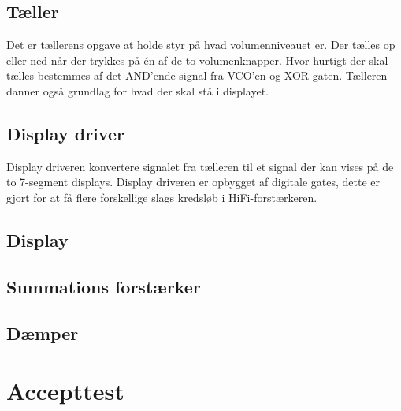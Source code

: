 \subsection{Tæller}
\label{volumenkontrol-simulering-taeller}

Det er tællerens opgave at holde styr på hvad volumenniveauet er. Der tælles op eller ned når der trykkes på én af de to volumenknapper. Hvor hurtigt der skal tælles bestemmes af det AND'ende signal fra VCO'en og XOR-gaten. Tælleren danner også grundlag for hvad der skal stå i displayet.

\subsection{Display driver}
\label{volumenkontrol-simulering-display_driver}

Display driveren konvertere signalet fra tælleren til et signal der kan vises på de to 7-segment displays. Display driveren er opbygget af digitale gates, dette er gjort for at få flere forskellige slags kredsløb i HiFi-forstærkeren.

\subsection{Display}
\label{volumenkontrol-simulering-display}



\subsection{Summations forstærker}
\label{volumenkontrol-simulering-summations_forstaerker}



\subsection{Dæmper}
\label{volumenkontrol-simulering-daemper}



\section{Accepttest}
\label{volumenkontrol-accepttest}

